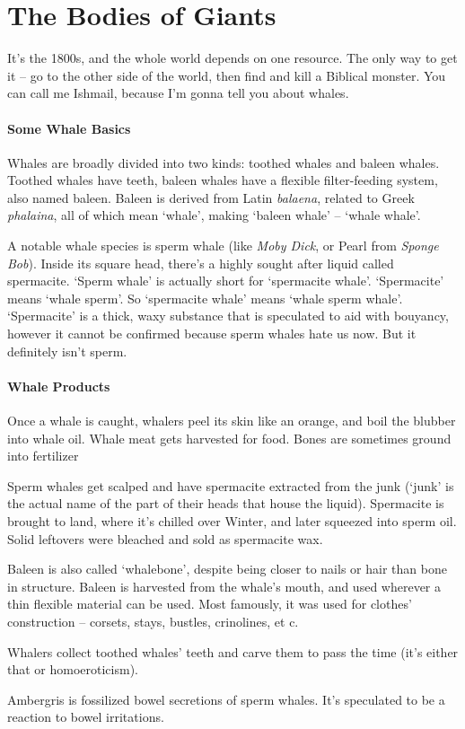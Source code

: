 \chapter{The Bodies of Giants}

It's the 1800s, and the whole world depends on one resource.
The only way to get it -- go to the other side of the world, then find and kill a Biblical monster.
You can call me Ishmail, because I'm gonna tell you about whales.

\begin{multicols}{2}

\subsubsection{Some Whale Basics}

Whales are broadly divided into two kinds: toothed whales and baleen whales.
Toothed whales have teeth, baleen whales have a flexible filter-feeding system, also named baleen.
Baleen is derived from Latin \textit{balaena}, related to Greek \textit{phalaina}, all of which mean `whale', making `baleen whale' -- `whale whale'.

A notable whale species is sperm whale (like \textit{Moby Dick}, or Pearl from \textit{Sponge Bob}).
Inside its square head, there's a highly sought after liquid called spermacite.
`Sperm whale' is actually short for `spermacite whale'.
`Spermacite' means `whale sperm'.
So `spermacite whale' means `whale sperm whale'.
`Spermacite' is a thick, waxy substance that is speculated to aid with bouyancy, however it cannot be confirmed because sperm whales hate us now.
But it definitely isn't sperm.

\subsubsection{Whale Products}

Once a whale is caught, whalers peel its skin like an orange, and boil the blubber into whale oil.
Whale meat gets harvested for food.
Bones are sometimes ground into fertilizer

Sperm whales get scalped and have spermacite extracted from the junk
(`junk' is the actual name of the part of their heads that house the liquid).
Spermacite is brought to land, where it's chilled over Winter, and later squeezed into sperm oil.
Solid leftovers were bleached and sold as spermacite wax.

Baleen is also called `whalebone', despite being closer to nails or hair than bone in structure.
Baleen is harvested from the whale's mouth, and used wherever a thin flexible material can be used.
Most famously, it was used for clothes' construction -- corsets, stays, bustles, crinolines, et c.

Whalers collect toothed whales' teeth and carve them to pass the time (it's either that or homoeroticism).

Ambergris is fossilized bowel secretions of sperm whales.
It's speculated to be a reaction to bowel irritations.

\end{multicols}
